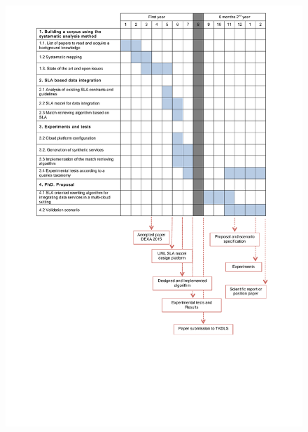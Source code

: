 \documentclass[12pt,a4paper,oneside]{report}
\begin{document}
\begin{figure}[!h]
\center
\includegraphics[scale=0.6]{calendario.pdf} 
\end{figure}
\end{document}
